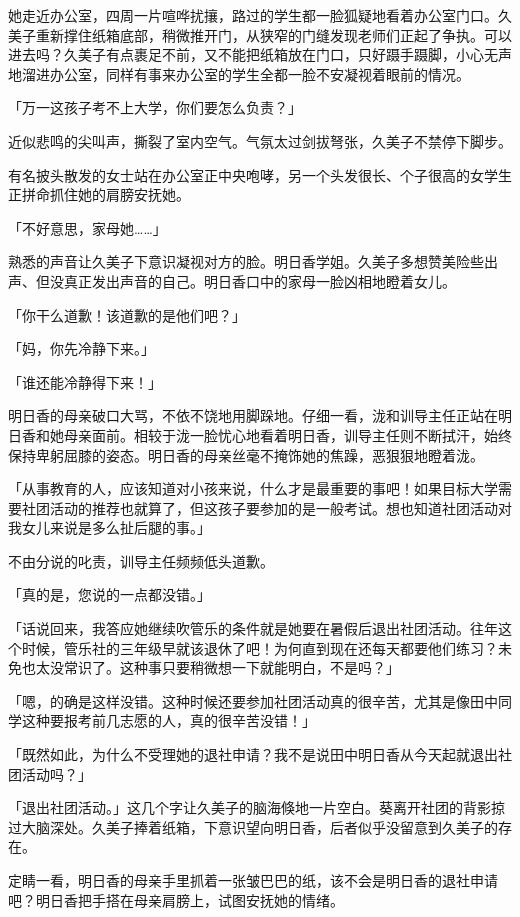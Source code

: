 \documentclass[UTF8]{ctexart}
\begin{document}
    她走近办公室，四周一片喧哗扰攘，路过的学生都一脸狐疑地看着办公室门口。久美子重新撑住纸箱底部，稍微推开门，从狭窄的门缝发现老师们正起了争执。可以进去吗？久美子有点裹足不前，又不能把纸箱放在门口，只好蹑手蹑脚，小心无声地溜进办公室，同样有事来办公室的学生全都一脸不安凝视着眼前的情况。 

    「万一这孩子考不上大学，你们要怎么负责？」 

    近似悲鸣的尖叫声，撕裂了室内空气。气氛太过剑拔弩张，久美子不禁停下脚步。 

    有名披头散发的女士站在办公室正中央咆哮，另一个头发很长、个子很高的女学生正拼命抓住她的肩膀安抚她。 

    「不好意思，家母她……」 

    熟悉的声音让久美子下意识凝视对方的脸。明日香学姐。久美子多想赞美险些出声、但没真正发出声音的自己。明日香口中的家母一脸凶相地瞪着女儿。 

    「你干么道歉！该道歉的是他们吧？」 

    「妈，你先冷静下来。」 

    「谁还能冷静得下来！」 

    明日香的母亲破口大骂，不依不饶地用脚跺地。仔细一看，泷和训导主任正站在明日香和她母亲面前。相较于泷一脸忧心地看着明日香，训导主任则不断拭汗，始终保持卑躬屈膝的姿态。明日香的母亲丝毫不掩饰她的焦躁，恶狠狠地瞪着泷。 

    「从事教育的人，应该知道对小孩来说，什么才是最重要的事吧！如果目标大学需要社团活动的推荐也就算了，但这孩子要参加的是一般考试。想也知道社团活动对我女儿来说是多么扯后腿的事。」 

    不由分说的叱责，训导主任频频低头道歉。 

    「真的是，您说的一点都没错。」 

    「话说回来，我答应她继续吹管乐的条件就是她要在暑假后退出社团活动。往年这个时候，管乐社的三年级早就该退休了吧！为何直到现在还每天都要他们练习？未免也太没常识了。这种事只要稍微想一下就能明白，不是吗？」 

    「嗯，的确是这样没错。这种时候还要参加社团活动真的很辛苦，尤其是像田中同学这种要报考前几志愿的人，真的很辛苦没错！」 

    「既然如此，为什么不受理她的退社申请？我不是说田中明日香从今天起就退出社团活动吗？」 

    「退出社团活动。」这几个字让久美子的脑海倏地一片空白。葵离开社团的背影掠过大脑深处。久美子捧着纸箱，下意识望向明日香，后者似乎没留意到久美子的存在。 

    定睛一看，明日香的母亲手里抓着一张皱巴巴的纸，该不会是明日香的退社申请吧？明日香把手搭在母亲肩膀上，试图安抚她的情绪。 
\end{document}
